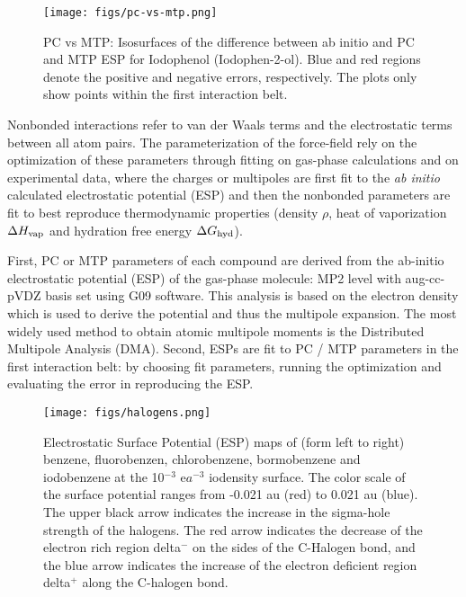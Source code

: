 \documentclass[journal=jacsat,manuscript=article]{achemso}
\begin{document}
\begin{figure}
\texttt{[image: figs/pc-vs-mtp.png]}
\caption{PC vs MTP: Isosurfaces of the difference between ab initio
  and PC and MTP ESP for Iodophenol (Iodophen-2-ol). Blue and red
  regions denote the positive and negative errors, respectively. The
  plots only show points within the first interaction belt.  }
\label{fig:pcvsmtp}
\end{figure}



\noindent
Nonbonded interactions refer to van der Waals terms and the
electrostatic terms between all atom pairs. The parameterization of
the force-field rely on the optimization of these parameters through
fitting on gas-phase calculations and on experimental data, where the
charges or multipoles are first fit to the {\it ab initio} calculated
electrostatic potential (ESP) and then the nonbonded parameters are
fit to best reproduce thermodynamic properties (density $\rho$, heat
of vaporization $\Delta H_{\rm vap}$ and hydration free energy $\Delta
G_{\rm hyd}$).
 
\noindent
First, PC or MTP parameters of each compound are derived from the
ab-initio electrostatic potential (ESP) of the gas-phase molecule: MP2
level with aug-cc-pVDZ basis set using G09 software. This analysis is
based on the electron density which is used to derive the potential
and thus the multipole expansion. The most widely used method to
obtain atomic multipole moments is the Distributed Multipole Analysis
(DMA).  Second, ESPs are fit to PC / MTP parameters in the first
interaction belt: by choosing fit parameters, running the optimization
and evaluating the error in reproducing the ESP.


\begin{figure}
\texttt{[image: figs/halogens.png]}
\caption{Electrostatic Surface Potential (ESP) maps of (form left to
  right) benzene, fluorobenzen, chlorobenzene, bormobenzene and
  iodobenzene at the 10$^{-3}$ e$a^{-3}$ iodensity surface. The color
  scale of the surface potential ranges from -0.021 au (red) to 0.021
  au (blue). The upper black arrow indicates the increase in the
  sigma-hole strength of the halogens. The red arrow indicates the
  decrease of the electron rich region delta$^-$ on the sides of the
  C-Halogen bond, and the blue arrow indicates the increase of the
  electron deficient region delta$^+$ along the C-halogen bond.}
\label{fig:halogens}
\end{figure}
\end{document}
